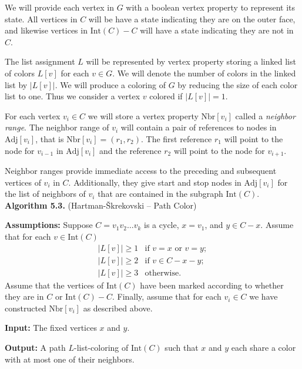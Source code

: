 \documentclass[letterpaper, 12pt]{article}
\theoremstyle{thm}
\begin{document}
We will provide each vertex in $G$ with a boolean vertex property to represent
its state. All vertices in $C$ will be have a state indicating they are on the
outer face, and likewise vertices in $\text{Int}(C)-C$ will have a state
indicating they are not in $C$.

The list assignment $L$ will be represented by vertex property storing a linked
list of colors $L[v]$ for each $v\in G$. We will denote the number of colors
in the linked list by $\big|L[v]\big|$. We will produce a coloring of $G$ by reducing
the size of each color list to one. Thus we consider a vertex $v$
colored if $\big|L[v]\big|=1$.

For each vertex $v_i\in C$ we will store a vertex property $\text{Nbr}[v_i]$
called a \textit{neighbor range}. The neighbor range of $v_i$ will contain a pair of
references to nodes in $\text{Adj}[v_i]$, that is $\text{Nbr}[v_i]=(r_1,r_2)$.
The first reference $r_1$ will point to the
node for $v_{i-1}$ in $\text{Adj}[v_i]$ and the reference $r_2$ will point to
the node for $v_{i+1}$.

Neighbor ranges provide immediate access to the preceding and subsequent
vertices of $v_i$ in $C$. Additionally, they give start and stop nodes in
$\text{Adj}[v_i]$ for the list of neighbors of $v_i$ that are contained in the
subgraph $\text{Int}(C)$.\\

\noindent\textbf{Algorithm 5.3.} (Hartman-\v{S}krekovski -- Path Color)

\noindent\textbf{Assumptions:} Suppose $C=v_1v_2\ldots v_k$ is a cycle, $x=v_1$,
and $y\in C-x$. Assume that for each $v\in \text{Int}(C)$
\[
    \begin{array}{ll}
	    \big|L[v]\big|\ge 1 & \text{if } v=x \text{ or } v=y;\\
	    \big|L[v]\big|\ge 2 & \text{if } v\in C-x-y;\\
	    \big|L[v]\big|\ge 3 & \text{otherwise.}
    \end{array}
\]
Assume that the vertices of
$\text{Int}(C)$ have been marked according to whether they are in $C$ or
$\text{Int}(C)-C$. Finally, assume that for each $v_i\in C$ we have constructed
$\text{Nbr}[v_i]$ as described above.

\noindent\textbf{Input:} The fixed vertices $x$ and $y$.

\noindent\textbf{Output:} A path $L$-list-coloring of $\text{Int}(C)$ such that
$x$ and $y$ each share a color with at most one of their neighbors.
\end{document}
